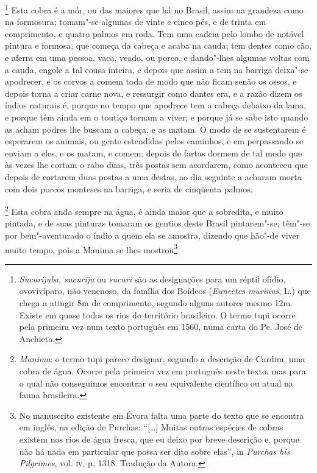 \footnote{ \textit{Sucurijuba, sucuriju}
ou \textit{sucuri} são as designações para um réptil ofídio,
ovovivíparo, não venenoso, da família dos Boídeos (\textit{Eunectes
murinus}, L.) que chega a atingir 8m de comprimento, segundo alguns
autores mesmo 12m. Existe em quase todos os rios do território
brasileiro. O termo tupi ocorre pela primeira vez num texto português
em 1560, numa carta do Pe. José de Anchieta.} Esta
cobra é a mór, ou das maiores que há no Brasil, assim na grandeza como
na formosura; tomam"-se algumas de vinte e cinco pés, e de trinta em
comprimento, e quatro palmos em roda. Tem uma cadeia pelo lombo de
notável pintura e formosa, que começa da cabeça e acaba na cauda; tem
dentes como cão, e aferra em uma pessoa, vaca, veado, ou porco, e
dando"-lhes algumas voltas com a cauda, engole a tal cousa inteira, e
depois que assim a tem na barriga deixa"-se apodrecer, e os corvos a
comem toda de modo que não ficam senão os ossos, e depois torna a criar
carne nova, e ressurgir como dantes era, e a razão dizem os índios
naturais é, porque no tempo que apodrece tem a cabeça debaixo da lama,
e porque têm ainda em o toutiço tornam a viver; e porque já se sabe
isto quando as acham podres lhe buscam a cabeça, e as matam. O modo de
se sustentarem é esperarem os animais, ou gente estendidas pelos
caminhos, e em perpassando se enviam a eles, e os matam, e comem;
depois de fartas dormem de tal modo que às vezes lhe cortam o rabo
duas, três postas sem acordarem, como aconteceu que depois de cortarem
duas postas a uma destas, ao dia seguinte a acharam morta com dois
porcos monteses na barriga, e seria de cinqüenta palmos.

\footnote{ \textit{Manima}: o termo tupi parece
designar, segundo a descrição de Cardim, uma cobra de água. Ocorre pela
primeira vez em português neste texto, mas para o qual não conseguimos
encontrar o seu equivalente científico ou atual na fauna
brasileira.} Esta cobra anda sempre na água, é ainda maior
que a sobredita, e muito pintada, e de suas pinturas tomaram os gentios
deste Brasil pintarem"-se; têm"-se por bem"-aventurado o índio a quem ela
se amostra, dizendo que hão"-de viver muito tempo, pois a Manima se lhes
mostrou\footnote{ No manuscrito existente em Évora falta uma parte
do texto que se encontra em inglês, na edição de Purchas: ``[\ldots{}] 
Muitas outras espécies de cobras existem nos rios de água fresca, que
eu deixo por breve descrição e, porque não há nada em particular que
possa ser dito sobre elas'', in \textit{Purchas his Pilgrimes}, vol.
\textsc{iv}, p. 1318. Tradução da Autora.} 



